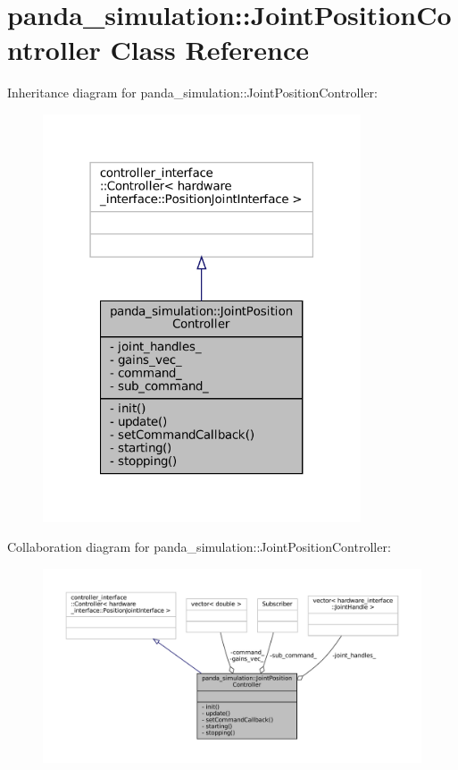 \hypertarget{classpanda__simulation_1_1JointPositionController}{}\section{panda\+\_\+simulation\+:\+:Joint\+Position\+Controller Class Reference}
\label{classpanda__simulation_1_1JointPositionController}


Inheritance diagram for panda\+\_\+simulation\+:\+:Joint\+Position\+Controller\+:
\nopagebreak
\begin{figure}[H]
\begin{center}
\leavevmode
\includegraphics[width=267pt]{classpanda__simulation_1_1JointPositionController__inherit__graph}
\end{center}
\end{figure}


Collaboration diagram for panda\+\_\+simulation\+:\+:Joint\+Position\+Controller\+:
\nopagebreak
\begin{figure}[H]
\begin{center}
\leavevmode
\includegraphics[width=350pt]{classpanda__simulation_1_1JointPositionController__coll__graph}
\end{center}
\end{figure}
